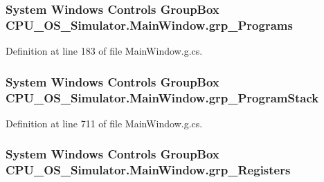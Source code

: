 \subsubsection[{grp\+\_\+\+Programs}]{\setlength{\rightskip}{0pt plus 5cm}System Windows Controls Group\+Box C\+P\+U\+\_\+\+O\+S\+\_\+\+Simulator.\+Main\+Window.\+grp\+\_\+\+Programs\hspace{0.3cm}{\ttfamily [package]}}\label{class_c_p_u___o_s___simulator_1_1_main_window_a2cafe5a8b54ae3e95a770abc594519a0}


Definition at line 183 of file Main\+Window.\+g.\+cs.

\hypertarget{class_c_p_u___o_s___simulator_1_1_main_window_a10687b397ff3a0381a556096a14ed0b0}{}
\subsubsection[{grp\+\_\+\+Program\+Stack}]{\setlength{\rightskip}{0pt plus 5cm}System Windows Controls Group\+Box C\+P\+U\+\_\+\+O\+S\+\_\+\+Simulator.\+Main\+Window.\+grp\+\_\+\+Program\+Stack\hspace{0.3cm}{\ttfamily [package]}}\label{class_c_p_u___o_s___simulator_1_1_main_window_a10687b397ff3a0381a556096a14ed0b0}


Definition at line 711 of file Main\+Window.\+g.\+cs.

\hypertarget{class_c_p_u___o_s___simulator_1_1_main_window_af858add509dfe2b90f0d356822f73737}{}
\subsubsection[{grp\+\_\+\+Registers}]{\setlength{\rightskip}{0pt plus 5cm}System Windows Controls Group\+Box C\+P\+U\+\_\+\+O\+S\+\_\+\+Simulator.\+Main\+Window.\+grp\+\_\+\+Registers\hspace{0.3cm}{\ttfamily [package]}}\label{class_c_p_u___o_s___simulator_1_1_main_window_af858add509dfe2b90f0d356822f73737}


